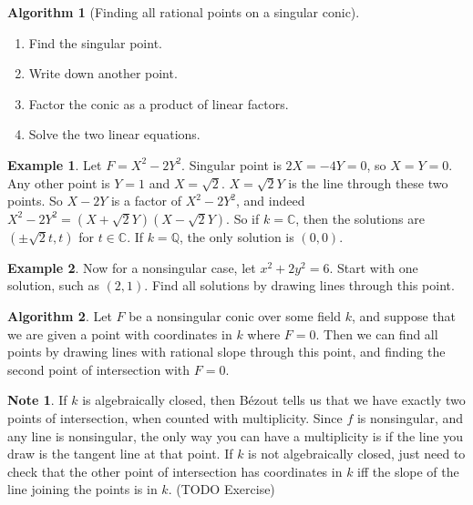 \documentclass{article}
\newcommand{\Q}{\mathbb{Q}}
\newcommand{\C}{\mathbb{C}}
\newcommand{\rb}[1]{\left( #1 \right)}
\theoremstyle{definition}\newtheorem{definition}{Definition}[section]
\theoremstyle{definition}\newtheorem{remark}[definition]{Remark}
\theoremstyle{definition}\newtheorem*{example}{Example}
\theoremstyle{definition}\newtheorem*{note}{Note}
\newtheorem{algorithm}[definition]{Algorithm}
\begin{document}
\begin{algorithm}[Finding all rational points on a singular conic]
\hfill
\begin{enumerate}
\item Find the singular point.
\item Write down another point.
\item Factor the conic as a product of linear factors.
\item Solve the two linear equations.
\end{enumerate}
\end{algorithm}

\begin{example}
Let $ F = X^2 - 2Y^2 $. Singular point is $ 2X = -4Y = 0 $, so $ X = Y = 0 $. Any other point is $ Y = 1 $ and $ X = \sqrt{2} $. $ X = \sqrt{2}Y $ is the line through these two points. So $ X - 2Y $ is a factor of $ X^2 - 2Y^2 $, and indeed $ X^2 - 2Y^2 = \rb{X + \sqrt{2}Y}\rb{X - \sqrt{2}Y} $. So if $ k = \C $, then the solutions are $ \rb{\pm\sqrt{2}t, t} $ for $ t \in \C $. If $ k = \Q $, the only solution is $ \rb{0, 0} $.
\end{example}

\begin{example}
Now for a nonsingular case, let $ x^2 + 2y^2 = 6 $. Start with one solution, such as $ \rb{2, 1} $. Find all solutions by drawing lines through this point.
\end{example}

\begin{algorithm}
Let $ F $ be a nonsingular conic over some field $ k $, and suppose that we are given a point with coordinates in $ k $ where $ F = 0 $. Then we can find all points by drawing lines with rational slope through this point, and finding the second point of intersection with $ F = 0 $.
\end{algorithm}

\begin{note}
If $ k $ is algebraically closed, then Bézout tells us that we have exactly two points of intersection, when counted with multiplicity. Since $ f $ is nonsingular, and any line is nonsingular, the only way you can have a multiplicity is if the line you draw is the tangent line at that point. If $ k $ is not algebraically closed, just need to check that the other point of intersection has coordinates in $ k $ iff the slope of the line joining the points is in $ k $. (TODO Exercise)
\end{note}

\end{document}
